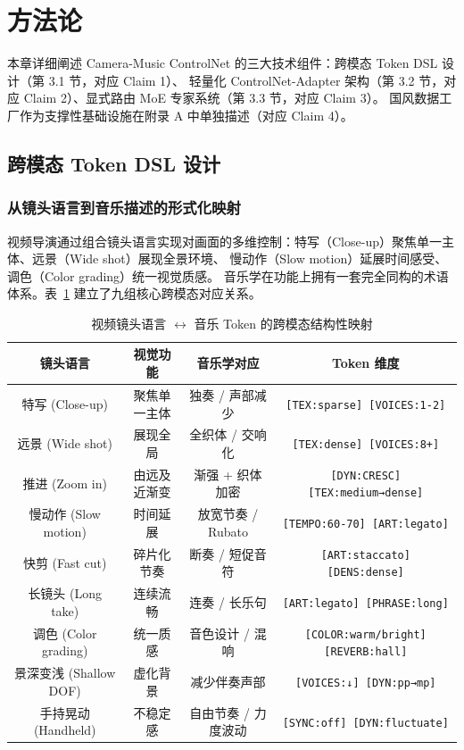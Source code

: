 \section{方法论}

本章详细阐述 Camera-Music ControlNet 的三大技术组件：跨模态 Token DSL 设计（第 3.1 节，对应 Claim 1）、
轻量化 ControlNet-Adapter 架构（第 3.2 节，对应 Claim 2）、显式路由 MoE 专家系统（第 3.3 节，对应 Claim 3）。
国风数据工厂作为支撑性基础设施在附录 A 中单独描述（对应 Claim 4）。

\subsection{跨模态 Token DSL 设计}

\subsubsection{从镜头语言到音乐描述的形式化映射}

视频导演通过组合镜头语言实现对画面的多维控制：特写（Close-up）聚焦单一主体、远景（Wide shot）展现全景环境、
慢动作（Slow motion）延展时间感受、调色（Color grading）统一视觉质感。
音乐学在功能上拥有一套完全同构的术语体系。表~\ref{tab:mapping} 建立了九组核心跨模态对应关系。

\begin{table}[H]
\centering
\caption{视频镜头语言 $\leftrightarrow$ 音乐 Token 的跨模态结构性映射}
\label{tab:mapping}
\begin{tabular}{c|c|c|c}
\toprule
\textbf{镜头语言} & \textbf{视觉功能} & \textbf{音乐学对应} & \textbf{Token 维度} \\
\midrule
特写 (Close-up) & 聚焦单一主体 & 独奏 / 声部减少 & \texttt{[TEX:sparse] [VOICES:1-2]} \\
远景 (Wide shot) & 展现全局 & 全织体 / 交响化 & \texttt{[TEX:dense] [VOICES:8+]} \\
推进 (Zoom in) & 由远及近渐变 & 渐强 + 织体加密 & \texttt{[DYN:CRESC] [TEX:medium→dense]} \\
慢动作 (Slow motion) & 时间延展 & 放宽节奏 / Rubato & \texttt{[TEMPO:60-70] [ART:legato]} \\
快剪 (Fast cut) & 碎片化节奏 & 断奏 / 短促音符 & \texttt{[ART:staccato] [DENS:dense]} \\
长镜头 (Long take) & 连续流畅 & 连奏 / 长乐句 & \texttt{[ART:legato] [PHRASE:long]} \\
调色 (Color grading) & 统一质感 & 音色设计 / 混响 & \texttt{[COLOR:warm/bright] [REVERB:hall]} \\
景深变浅 (Shallow DOF) & 虚化背景 & 减少伴奏声部 & \texttt{[VOICES:↓] [DYN:pp→mp]} \\
手持晃动 (Handheld) & 不稳定感 & 自由节奏 / 力度波动 & \texttt{[SYNC:off] [DYN:fluctuate]} \\
\bottomrule
\end{tabular}
\end{table}

